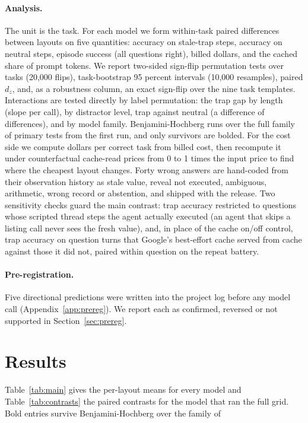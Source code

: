 \paragraph{Analysis.} The unit is the task. For each model we form within-task paired differences between layouts on five quantities: accuracy on stale-trap steps, accuracy on neutral steps, episode success (all questions right), billed dollars, and the cached share of prompt tokens. We report two-sided sign-flip permutation tests over tasks (20,000 flips), task-bootstrap 95 percent intervals (10,000 resamples), paired $d_z$, and, as a robustness column, an exact sign-flip over the nine task templates. Interactions are tested directly by label permutation: the trap gap by length (slope per call), by distractor level, trap against neutral (a difference of differences), and by model family. Benjamini-Hochberg runs over the full family of primary tests from the first run, and only survivors are bolded. For the cost side we compute dollars per correct task from billed cost, then recompute it under counterfactual cache-read prices from 0 to 1 times the input price to find where the cheapest layout changes. Forty wrong answers are hand-coded from their observation history as stale value, reveal not executed, ambiguous, arithmetic, wrong record or abstention, and shipped with the release. Two sensitivity checks guard the main contrast: trap accuracy restricted to questions whose scripted thread steps the agent actually executed (an agent that skips a listing call never sees the fresh value), and, in place of the cache on/off control, trap accuracy on question turns that Google's best-effort cache served from cache against those it did not, paired within question on the repeat battery.

\paragraph{Pre-registration.} Five directional predictions were written into the project log before any model call (Appendix~\ref{app:prereg}). We report each as confirmed, reversed or not supported in Section~\ref{sec:prereg}.

\section{Results}
\label{sec:results}

Table~\ref{tab:main} gives the per-layout means for every model and Table~\ref{tab:contrasts} the paired contrasts for the model that ran the full grid. Bold entries survive Benjamini-Hochberg over the family of 

